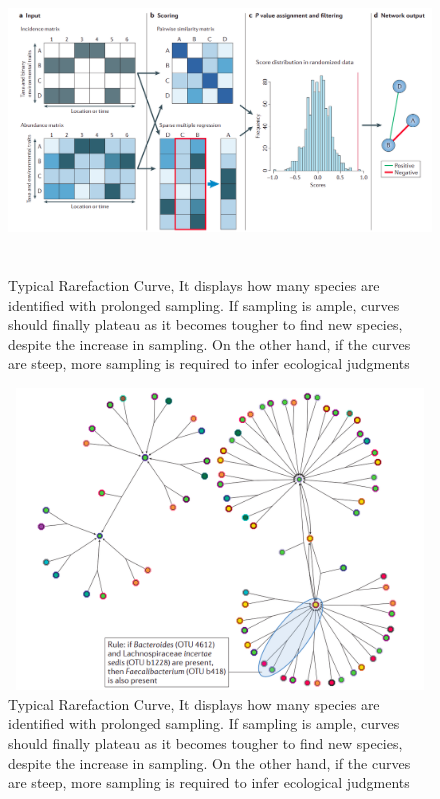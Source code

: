 \begin{figure}
  \centering
  \includegraphics[width=14cm, height=8cm] {../figures/Figure7.png}
  \caption{Typical Rarefaction Curve, It displays how many species are identified with prolonged sampling. If sampling is ample, curves should finally plateau as it becomes tougher to find new species, despite the increase in sampling. On the other hand, if the curves are steep, more sampling is required to infer ecological judgments \cite{ref11}}
  \label{fig:figure7}
\end{figure}

\begin{figure}
  \centering
  \includegraphics[width=14cm, height=8cm] {../figures/Figure8.png}
  \caption{Typical Rarefaction Curve, It displays how many species are identified with prolonged sampling. If sampling is ample, curves should finally plateau as it becomes tougher to find new species, despite the increase in sampling. On the other hand, if the curves are steep, more sampling is required to infer ecological judgments \cite{ref11}}
  \label{fig:figure8}
\end{figure}
